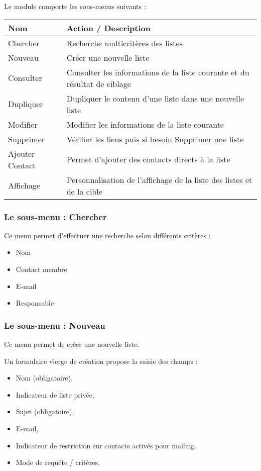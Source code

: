 Le module \List comporte les sous-menus suivants :

\begin{tabular}{|p{2.5cm}|p{9.5cm}|}
\hline
\textbf{Nom} & \textbf{Action / Description} \\
\hline
Chercher & Recherche multicritères des listes \\
\hline
Nouveau & Créer une nouvelle liste \\
\hline
Consulter & Consulter les informations de la liste courante et du résultat de ciblage \\
\hline
Dupliquer & Dupliquer le contenu d'une liste dans une nouvelle liste \\
\hline
Modifier & Modifier les informations de la liste courante\\
\hline
Supprimer & Vérifier les liens puis si besoin Supprimer une liste\\
\hline
Ajouter Contact & Permet d'ajouter des contacts directs à la liste\\
\hline
Affichage & Personnalisation de l'affichage de la liste des listes et de la cible\\
\hline
\end{tabular}


\subsubsection{Le sous-menu : Chercher}

Ce menu permet d'effectuer une recherche selon différents critères :

\begin{itemize}
\item Nom
\item Contact membre
\item E-mail
\item Responsable
\end{itemize}


\subsubsection{Le sous-menu : Nouveau}

Ce menu permet de créer une nouvelle liste.

Un formulaire vierge de création propose la saisie des champs :

\begin{itemize}
\item Nom (obligatoire),
\item Indicateur de liste privée,
\item Sujet (obligatoire),
\item E-mail,
\item Indicateur de restriction sur contacts activés pour mailing.
\item Mode de requête / critères.
\end{itemize}
\vspace{0.3cm}

